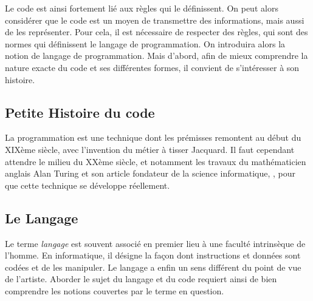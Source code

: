 \documentclass[12pt]{article} %
\begin{document}
Le code est ainsi fortement lié aux règles qui le définissent. On peut alors considérer que le code est un moyen de transmettre des informations, mais aussi de les représenter. Pour cela, il est nécessaire de respecter des règles, qui sont des normes qui définissent le langage de programmation. On introduira alors la notion de langage de programmation. Mais d'abord, afin de mieux comprendre la nature exacte du code et ses différentes formes, il convient de s'intéresser à son histoire.

\subsection{Petite Histoire du code}
La programmation est une technique dont les prémisses remontent au début du XIXème siècle, avec l'invention du métier à tisser Jacquard. Il faut cependant attendre le milieu du XXème siècle, et notamment les travaux du mathématicien anglais Alan Turing et son article fondateur de la science informatique, , pour que cette technique se développe réellement.



\subsection{Le Langage}

Le terme \textit{langage} est souvent associé en premier lieu à une faculté intrinsèque de l'homme. En informatique, il désigne la façon dont instructions et données sont codées et de les manipuler. Le langage a enfin un sens différent du point de vue de l'artiste. Aborder le sujet du langage et du code requiert ainsi de bien comprendre les notions couvertes par le terme en question. 
\end{document}
